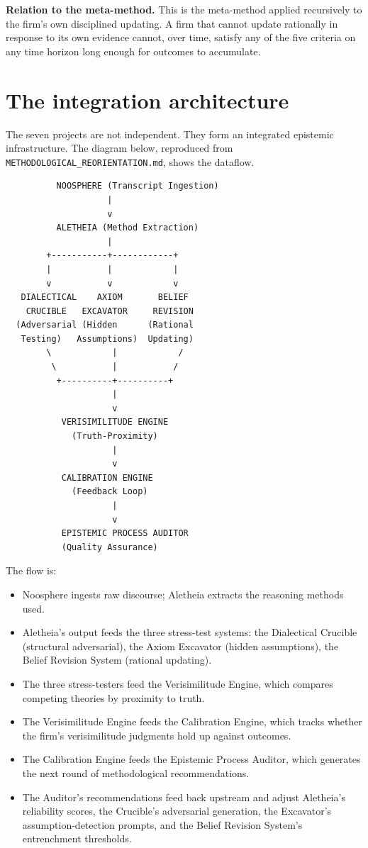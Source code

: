 \documentclass[11pt,letterpaper]{article}
\newcommand{\file}[1]{\texttt{#1}}
\begin{document}
\textbf{Relation to the meta-method.} This is the meta-method applied recursively to the firm's own disciplined updating. A firm that cannot update rationally in response to its own evidence cannot, over time, satisfy any of the five criteria on any time horizon long enough for outcomes to accumulate.

\section{The integration architecture}

The seven projects are not independent. They form an integrated epistemic infrastructure. The diagram below, reproduced from \file{METHODOLOGICAL\_REORIENTATION.md}, shows the dataflow.

\begin{verbatim}
          NOOSPHERE (Transcript Ingestion)
                    |
                    v
          ALETHEIA (Method Extraction)
                    |
        +-----------+------------+
        |           |            |
        v           v            v
   DIALECTICAL    AXIOM       BELIEF
    CRUCIBLE   EXCAVATOR     REVISION
  (Adversarial (Hidden      (Rational
   Testing)   Assumptions)  Updating)
        \            |            /
         \           |           /
          +----------+----------+
                     |
                     v
           VERISIMILITUDE ENGINE
             (Truth-Proximity)
                     |
                     v
           CALIBRATION ENGINE
             (Feedback Loop)
                     |
                     v
           EPISTEMIC PROCESS AUDITOR
           (Quality Assurance)
\end{verbatim}

The flow is:

\begin{itemize}[leftmargin=1.5em,itemsep=0.1em]
\item Noosphere ingests raw discourse; Aletheia extracts the reasoning methods used.
\item Aletheia's output feeds the three stress-test systems: the Dialectical Crucible (structural adversarial), the Axiom Excavator (hidden assumptions), the Belief Revision System (rational updating).
\item The three stress-testers feed the Verisimilitude Engine, which compares competing theories by proximity to truth.
\item The Verisimilitude Engine feeds the Calibration Engine, which tracks whether the firm's verisimilitude judgments hold up against outcomes.
\item The Calibration Engine feeds the Epistemic Process Auditor, which generates the next round of methodological recommendations.
\item The Auditor's recommendations feed back upstream and adjust Aletheia's reliability scores, the Crucible's adversarial generation, the Excavator's assumption-detection prompts, and the Belief Revision System's entrenchment thresholds.
\end{itemize}
\end{document}
